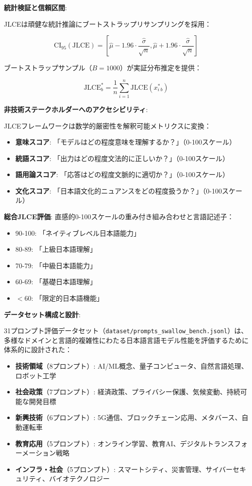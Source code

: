 \documentclass[12pt,a4paper]{article}
\begin{document}
\textbf{統計検証と信頼区間}:

JLCEは頑健な統計推論にブートストラップリサンプリングを採用：

\begin{equation}
\text{CI}_{95}(\text{JLCE}) = \left[\hat{\mu} - 1.96 \cdot \frac{\hat{\sigma}}{\sqrt{n}}, \hat{\mu} + 1.96 \cdot \frac{\hat{\sigma}}{\sqrt{n}}\right]
\end{equation}

ブートストラップサンプル（$B=1000$）が実証分布推定を提供：

\begin{equation}
\text{JLCE}^*_b = \frac{1}{n} \sum_{i=1}^{n} \text{JLCE}(x_i^*_b)
\end{equation}

\textbf{非技術ステークホルダーへのアクセシビリティ}:

JLCEフレームワークは数学的厳密性を解釈可能メトリクスに変換：

\begin{itemize}
\item \textbf{意味スコア}: 「モデルはどの程度意味を理解するか？」（0-100スケール）
\item \textbf{統語スコア}: 「出力はどの程度文法的に正しいか？」（0-100スケール）
\item \textbf{語用論スコア}: 「応答はどの程度文脈的に適切か？」（0-100スケール）
\item \textbf{文化スコア}: 「日本語文化的ニュアンスをどの程度扱うか？」（0-100スケール）
\end{itemize}

\textbf{総合JLCE評価}: 直感的0-100スケールの重み付き組み合わせと言語記述子：
\begin{itemize}
\item 90-100: 「ネイティブレベル日本語能力」
\item 80-89: 「上級日本語理解」
\item 70-79: 「中級日本語能力」
\item 60-69: 「基礎日本語理解」
\item $<60$: 「限定的日本語機能」
\end{itemize}

\textbf{データセット構成と設計}:

31プロンプト評価データセット（\texttt{dataset/prompts\_swallow\_bench.jsonl}）は、多様なドメインと言語的複雑性にわたる日本語言語モデル性能を評価するために体系的に設計された：

\begin{itemize}
\item \textbf{技術領域}（8プロンプト）: AI/ML概念、量子コンピュータ、自然言語処理、ロボット工学
\item \textbf{社会政策}（7プロンプト）: 経済政策、プライバシー保護、気候変動、持続可能な開発目標
\item \textbf{新興技術}（6プロンプト）: 5G通信、ブロックチェーン応用、メタバース、自動運転車
\item \textbf{教育応用}（5プロンプト）: オンライン学習、教育AI、デジタルトランスフォーメーション戦略
\item \textbf{インフラ・社会}（5プロンプト）: スマートシティ、災害管理、サイバーセキュリティ、バイオテクノロジー
\end{itemize}
\end{document}
